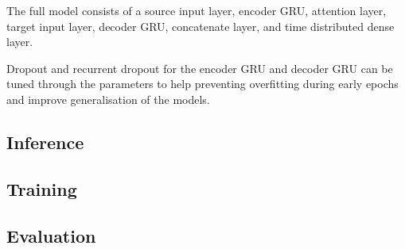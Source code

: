 The full model consists of a source input layer, encoder \acrshort{GRU}, attention layer, target input layer, decoder \acrshort{GRU}, concatenate layer, and time distributed dense layer.


Dropout and recurrent dropout for the encoder \acrshort{GRU} and decoder \acrshort{GRU} can be tuned through the parameters to help preventing overfitting during early epochs and improve generalisation of the models.


\subsection{Inference}



\subsection{Training}

\subsection{Evaluation}


